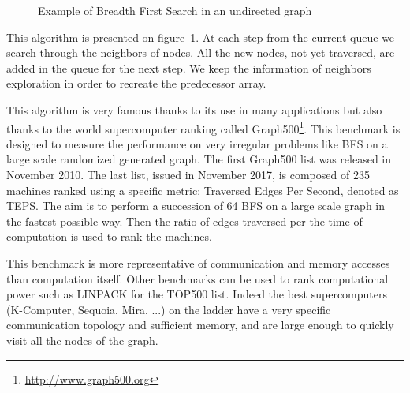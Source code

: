 \begin{figure}
\caption{Example of Breadth First Search in an undirected graph}
\label{fig:part2_chap3:BFS}
\end{figure}


This algorithm is presented on figure~\ref{fig:part2_chap3:BFS}.
At each step from the current queue we search through the neighbors of nodes. 
All the new nodes, not yet traversed, are added in the queue for the next step.
We keep the information of neighbors exploration in order to recreate the predecessor array. 

This algorithm is very famous thanks to its use in many applications but also thanks to the world supercomputer ranking called Graph500\footnote{\url{http://www.graph500.org}}.
This benchmark is designed to measure the performance on very irregular problems like BFS on a large scale randomized generated graph. 
The first Graph500 list was released in November 2010.
The last list, issued in November 2017, is composed of 235 machines ranked using a specific metric: Traversed Edges Per Second, denoted as TEPS. 
The aim is to perform a succession of 64 BFS on a large scale graph in the fastest possible way.
Then the ratio of edges traversed per the time of computation is used to rank the machines.

This benchmark is more representative of communication and memory accesses than computation itself. 
Other benchmarks can be used to rank computational power such as LINPACK for the TOP500 list.
Indeed the best supercomputers (K-Computer, Sequoia, Mira, ...) on the ladder have a very specific communication topology and sufficient memory, and are large enough to quickly visit all the nodes of the graph. 

